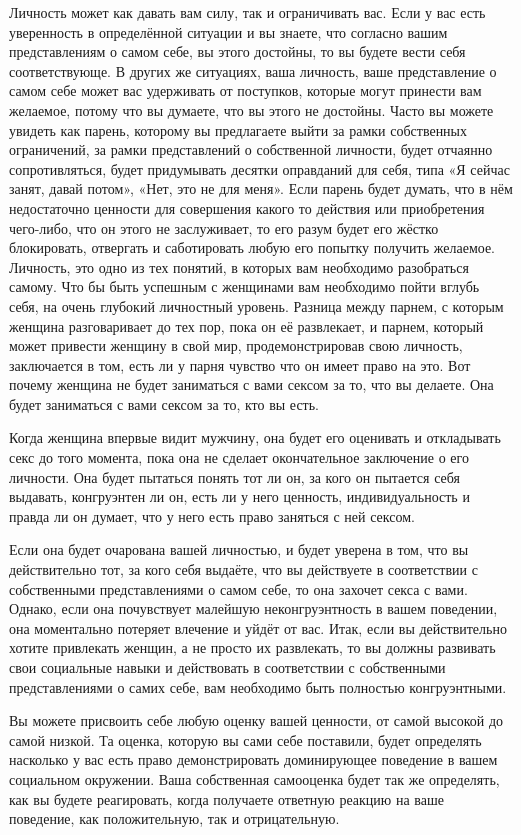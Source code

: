 Личность может как давать вам силу, так и ограничивать вас. Если у вас есть уверенность в определённой ситуации и вы знаете, что согласно вашим представлениям о самом себе, вы этого достойны, то вы будете вести себя соответствующе. В других же ситуациях, ваша личность, ваше представление о самом себе может вас удерживать от поступков, которые могут принести вам желаемое, потому что вы думаете, что вы этого не достойны. Часто вы можете увидеть как парень, которому вы предлагаете выйти за рамки собственных ограничений, за рамки представлений о собственной личности, будет отчаянно сопротивляться, будет придумывать десятки оправданий для себя, типа «Я сейчас занят, давай потом», «Нет, это не для меня». Если парень будет думать, что в нём недостаточно ценности для совершения какого то действия или приобретения чего-либо, что он этого не заслуживает, то его разум будет его жёстко блокировать, отвергать и саботировать любую его попытку получить желаемое. Личность, это одно из тех понятий, в которых вам необходимо разобраться самому. Что бы быть успешным с женщинами вам необходимо пойти вглубь себя, на очень глубокий личностный уровень. Разница между парнем, с которым женщина разговаривает до тех пор, пока он её развлекает, и парнем, который может привести женщину в свой мир, продемонстрировав свою личность, заключается в том, есть ли у парня чувство что он имеет право на это. Вот почему женщина не будет заниматься с вами сексом за то, что вы делаете. Она будет заниматься с вами сексом за то, кто вы есть.

Когда женщина впервые видит мужчину, она будет его оценивать и откладывать секс до того момента, пока она не сделает окончательное заключение о его личности. Она будет пытаться понять тот ли он, за кого он пытается себя выдавать, конгруэнтен ли он, есть ли у него ценность, индивидуальность и правда ли он думает, что у него есть право заняться с ней сексом.

Если она будет очарована вашей личностью, и будет уверена в том, что вы действительно тот, за кого себя выдаёте, что вы действуете в соответствии с собственными представлениями о самом себе, то она захочет секса с вами. Однако, если она почувствует малейшую неконгруэнтность в вашем поведении, она моментально потеряет влечение и уйдёт от вас. Итак, если вы действительно хотите привлекать женщин, а не просто их развлекать, то вы должны развивать свои социальные навыки и действовать в соответствии с собственными представлениями о самих себе, вам необходимо быть полностью конгруэнтными.

\RULE  Вы можете присвоить себе любую оценку вашей ценности, от самой высокой до самой низкой. Та оценка, которую вы сами себе поставили, будет определять насколько у вас есть право демонстрировать доминирующее поведение в вашем социальном окружении. Ваша собственная самооценка будет так же определять, как вы будете реагировать, когда получаете ответную реакцию на ваше поведение, как положительную, так и отрицательную.

